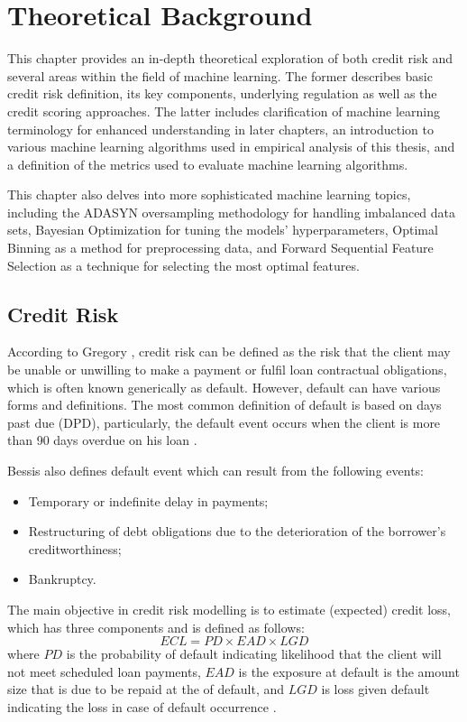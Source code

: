 \chapter{Theoretical Background}
\label{chap:two}
This chapter provides an in-depth theoretical exploration of both credit risk and several areas within the field of machine learning. The former describes basic credit risk definition, its key components, underlying regulation as well as the credit scoring approaches.
The latter includes clarification of machine learning terminology for enhanced understanding in later chapters, an introduction to various machine learning algorithms used in empirical analysis of this thesis, and a definition of the metrics used to evaluate machine learning algorithms.

This chapter also delves into more sophisticated machine learning topics, including the ADASYN oversampling methodology for handling imbalanced data sets, Bayesian Optimization for tuning the models' hyperparameters, Optimal Binning as a method for preprocessing data, and Forward Sequential Feature Selection as a technique for selecting the most optimal features.

\section{Credit Risk}
\label{sec:creditrisk}

According to Gregory \citep{gregory2012counterparty}, credit risk can be defined as the risk that the client may be unable or unwilling to make a payment or fulfil loan contractual obligations, which is often known generically as default.
However, default can have various forms and definitions. 
The most common definition of default is based on days past due (DPD), particularly, the default event occurs when the client is more than 90 days overdue on his loan \citep{brezigar2021modeling}.

Bessis \citep{bessis2015} also defines default event which can result from the following events:
\begin{itemize}\setlength\itemsep{0em}
    \item Temporary or indefinite delay in payments;
    \item Restructuring of debt obligations due to the deterioration of the borrower's creditworthiness;
    \item Bankruptcy.
\end{itemize}
The main objective in credit risk modelling is to estimate (expected) credit loss, which has three components and is defined as follows:
\begin{equation}
    ECL = PD \times EAD \times LGD
\end{equation}
where $PD$ is the probability of default indicating likelihood that the client will not meet scheduled loan payments, $EAD$ is the exposure at default is the amount size that is due to be repaid at the of default, and $LGD$ is loss given default indicating the loss in case of default occurrence \citep{doumpos2019analytical}.

